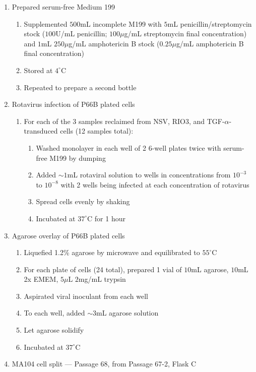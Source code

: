 \begin{enumerate}
	\item Prepared serum-free Medium 199
		\begin{enumerate}
			\item Supplemented $500$mL incomplete M199 with $5$mL penicillin/streptomycin stock ($100$U/mL penicillin; $100\mu$g/mL streptomycin final concentration) and $1$mL $250\mu$g/mL amphotericin B stock ($0.25\mu$g/mL amphotericin B final concentration)
			\item Stored at $4^{\circ}$C
			\item Repeated to prepare a second bottle
		\end{enumerate}
	\item Rotavirus infection of P66B plated cells
			\begin{enumerate}
				\item For each of the 3 samples reclaimed from NSV, RIO3, and TGF-$\alpha$-transduced cells (12 samples total):
					\begin{enumerate}
						\item Washed monolayer in each well of 2 6-well plates twice with serum-free M199 by dumping
						\item Added $\sim 1$mL rotaviral solution to wells in concentrations from $10^{-3}$ to $10^{-8}$ with 2 wells being infected at each concentration of rotavirus
						\item Spread cells evenly by shaking
						\item Incubated at $37^{\circ}$C for 1 hour
					\end{enumerate}
			\end{enumerate}
	\item Agarose overlay of P66B plated cells
		\begin{enumerate}
			\item Liquefied 1.2\% agarose by microwave and equilibrated to $55^{\circ}$C
			\item For each plate of cells (24 total), prepared 1 vial of $10$mL agarose, $10$mL 2x EMEM, $5\mu$L $2$mg/mL trypsin
			\item Aspirated viral inoculant from each well
			\item To each well, added $\sim3$mL agarose solution
			\item Let agarose solidify
			\item Incubated at $37^{\circ}$C
		\end{enumerate}
	\item MA104 cell split --- Passage 68, from Passage 67-2, Flask C

\end{enumerate}
